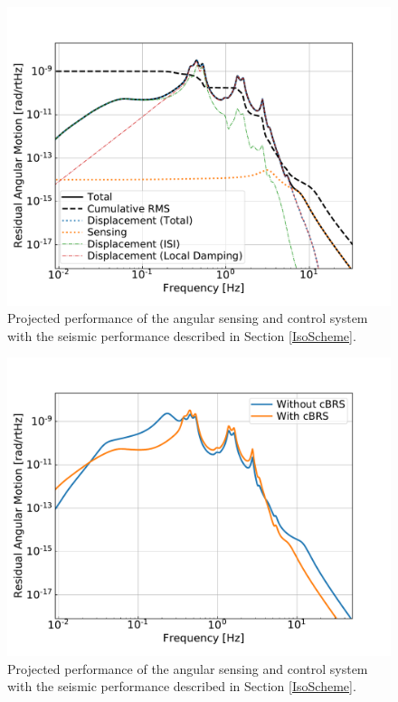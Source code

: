 \documentclass [12pt, proquest]{uwthesis}[2019]
\begin{document}
\begin{figure}
\begin{center}
\includegraphics[width=\textwidth]{cBRS_ASC_With.pdf}
\caption{Projected performance of the angular sensing and control system with the seismic performance described in Section \ref{IsoScheme}.}
\label{ascWith}
\end{center}
\end{figure}

\begin{figure}
\begin{center}
\includegraphics[width=\textwidth]{cBRS_ASC_LowF.pdf}
\caption{Projected performance of the angular sensing and control system with the seismic performance described in Section \ref{IsoScheme}.}
\label{ascComp}
\end{center}
\end{figure}
\end{document}
